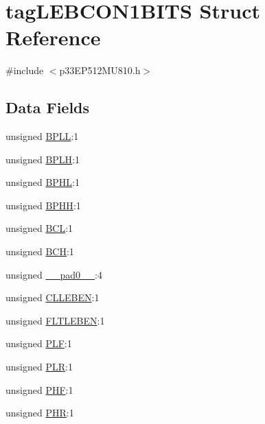 \hypertarget{structtag_l_e_b_c_o_n1_b_i_t_s}{}\section{tag\+L\+E\+B\+C\+O\+N1\+B\+I\+TS Struct Reference}
\label{structtag_l_e_b_c_o_n1_b_i_t_s}


{\ttfamily \#include $<$p33\+E\+P512\+M\+U810.\+h$>$}

\subsection*{Data Fields}
\begin{DoxyCompactItemize}
\item 
unsigned \hyperlink{structtag_l_e_b_c_o_n1_b_i_t_s_a734b807d032fa494468c04783b84279d}{B\+P\+LL}\+:1
\item 
unsigned \hyperlink{structtag_l_e_b_c_o_n1_b_i_t_s_ab92bd28ed3161199870cae9dca9d8264}{B\+P\+LH}\+:1
\item 
unsigned \hyperlink{structtag_l_e_b_c_o_n1_b_i_t_s_ab1b78e048d280a836358a465b1670e7a}{B\+P\+HL}\+:1
\item 
unsigned \hyperlink{structtag_l_e_b_c_o_n1_b_i_t_s_a8fd804263987e931f779f124751138e1}{B\+P\+HH}\+:1
\item 
unsigned \hyperlink{structtag_l_e_b_c_o_n1_b_i_t_s_acead45594aa9d4a55a37f37fdcc3f0a0}{B\+CL}\+:1
\item 
unsigned \hyperlink{structtag_l_e_b_c_o_n1_b_i_t_s_a485d688549b456635ec3ac860ad7cdaf}{B\+CH}\+:1
\item 
unsigned \hyperlink{structtag_l_e_b_c_o_n1_b_i_t_s_adf71f3d8410c1f1dbbc96680a92c49af}{\+\_\+\+\_\+pad0\+\_\+\+\_\+}\+:4
\item 
unsigned \hyperlink{structtag_l_e_b_c_o_n1_b_i_t_s_a4ec62ac7ec38a6cf1ca2276db69912a9}{C\+L\+L\+E\+B\+EN}\+:1
\item 
unsigned \hyperlink{structtag_l_e_b_c_o_n1_b_i_t_s_aa96ca2430a7a6200927f390d1aa0b21a}{F\+L\+T\+L\+E\+B\+EN}\+:1
\item 
unsigned \hyperlink{structtag_l_e_b_c_o_n1_b_i_t_s_ab72be8b35e01107182afb8e9733d72bb}{P\+LF}\+:1
\item 
unsigned \hyperlink{structtag_l_e_b_c_o_n1_b_i_t_s_a5f690459b53fc81b46dbbac226cecb25}{P\+LR}\+:1
\item 
unsigned \hyperlink{structtag_l_e_b_c_o_n1_b_i_t_s_a4ac425e6c1575269dfa33a0373584fff}{P\+HF}\+:1
\item 
unsigned \hyperlink{structtag_l_e_b_c_o_n1_b_i_t_s_ae02a9c6926c3a1feac21cec18a520e4a}{P\+HR}\+:1
\end{DoxyCompactItemize}


